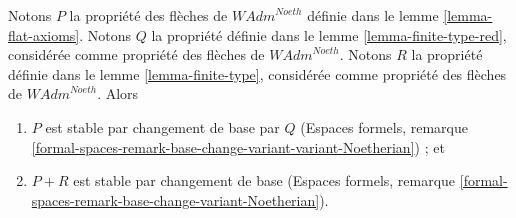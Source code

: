 \begin{lemma}
\label{lemma-base-change-flat-continuous}
Notons $P$ la propriété des flèches de $\textit{WAdm}^{Noeth}$ définie
dans le lemme \ref{lemma-flat-axioms}. Notons $Q$ la propriété définie
dans le lemme \ref{lemma-finite-type-red}, considérée comme propriété des
flèches de $\textit{WAdm}^{Noeth}$. Notons $R$ la propriété définie dans
le lemme \ref{lemma-finite-type}, considérée comme propriété des flèches
de $\textit{WAdm}^{Noeth}$. Alors
\begin{enumerate}
\item $P$ est stable par changement de base par $Q$ (Espaces formels,
remarque \ref{formal-spaces-remark-base-change-variant-variant-Noetherian}) ;
et
\item $P + R$ est stable par changement de base (Espaces formels,
remarque \ref{formal-spaces-remark-base-change-variant-Noetherian}).
\end{enumerate}
\end{lemma}

